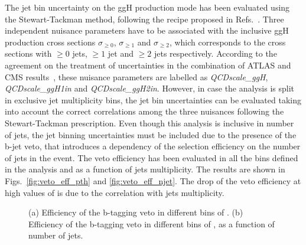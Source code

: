 The jet bin uncertainty on the ggH production mode has been evaluated using the Stewart-Tackman method, following the recipe proposed in Refs.~\cite{Stewart:2011cf,Heinemeyer:2013tqa}.
Three independent nuisance parameters have to be associated with the inclusive ggH production cross sections $\sigma_{\geq 0}$, $\sigma_{\geq 1}$ and $\sigma_{\geq 2}$, which corresponds to the cross sections with $\geq 0$ jets, $\geq 1$ jet and $\geq 2$ jets respectively. According to the agreement on the treatment of uncertainties in the combination of ATLAS and CMS results~\cite{ATLAS:2011tau}, these nuisance parameters are labelled as \emph{QCDscale\_ggH}, \emph{QCDscale\_ggH1in} and \emph{QCDscale\_ggH2in}. However, in case the analysis is split in exclusive jet multiplicity bins, the jet bin uncertainties can be evaluated taking into account the correct correlations among the three nuisances following the Stewart-Tackman prescription.
Even though this analysis is inclusive in number of jets, the jet binning uncertainties must be included due to the presence of the b-jet veto, that introduces a dependency of the selection efficiency on the number of jets in the event. The veto efficiency has been evaluated in all the \pth bins defined in the analysis and as a function of jets multiplicity. The results are shown in Figs.~\ref{fig:veto_eff_pth} and \ref{fig:veto_eff_njet}. The drop of the veto efficiency at high values of \pth is due to the correlation with jets multiplicity.
	 	
\begin{figure}[htb]
\centering
\caption{(a) Efficiency of the b-tagging veto in different bins of \pth. (b) Efficiency of the b-tagging veto in different bins of \pth, as a function of number of jets.}
\end{figure}

